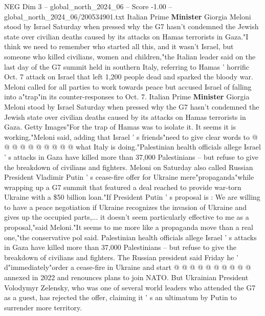 \begin{textsample}{NEG Dim 3 – global\_north\_2024\_06 – Score -1.00 – global\_north\_2024\_06/200534901.txt}  \label{ex:f3_neg_392}
Italian Prime \textbf{Minister} Giorgia Meloni stood by Israel Saturday when pressed why the G7 hasn't condemned the Jewish state over civilian deaths caused by its attacks on Hamas terrorists in Gaza."I think we need to remember who started all this, and it wasn't Israel, but someone who killed civilians, women and children,"the Italian leader said on the last day of the G7 summit held in southern Italy, referring to Hamas ' horrific Oct. 7 attack on Israel that left 1,200 people dead and sparked the bloody war.
Meloni called for all parties to work towards peace but accused Israel of falling into a"trap"in its counter-responses to Oct. 7.
Italian Prime \textbf{Minister} Giorgia Meloni stood by Israel Saturday when pressed why the G7 hasn't condemned the Jewish state over civilian deaths caused by its attacks on Hamas terrorists in Gaza.
Getty Images"For the trap of Hamas was to isolate it.
It seems it is working,"Meloni said, adding that Israel ' s friends"need to give clear words to @ @ @ @ @ @ @ @ @ @ what Italy is doing."Palestinian health officials allege Israel ' s attacks in Gaza have killed more than 37,000 Palestinians -- but refuse to give the breakdown of civilians and fighters.
Meloni on Saturday also called Russian President Vladimir Putin ' s cease-fire offer for Ukraine mere"propaganda"while wrapping up a G7 summit that featured a deal reached to provide war-torn Ukraine with a \$50 billion loan."If President Putin ' s proposal is : We are willing to have a peace negotiation if Ukraine recognizes the invasion of Ukraine and gives up the occupied parts,... it doesn't seem particularly effective to me as a proposal,"said Meloni."It seems to me more like a propaganda move than a real one,"the conservative pol said.
Palestinian health officials allege Israel ' s attacks in Gaza have killed more than 37,000 Palestinians -- but refuse to give the breakdown of civilians and fighters.
The Russian president said Friday he ' d"immediately"order a cease-fire in Ukraine and start @ @ @ @ @ @ @ @ @ @ annexed in 2022 and renounces plans to join NATO.
But Ukrainian President Volodymyr Zelensky, who was one of several world leaders who attended the G7 as a guest, has rejected the offer, claiming it ' s an ultimatum by Putin to surrender more territory.

\end{textsample}
